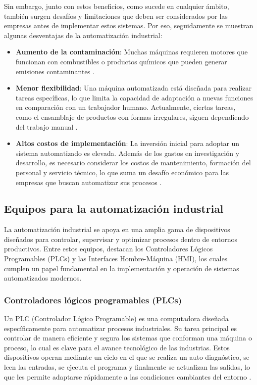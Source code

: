 Sin embargo, junto con estos beneficios, como sucede en cualquier ámbito, también surgen desafíos y limitaciones que deben ser considerados por las empresas antes de implementar estos sistemas. Por eso, seguidamente se muestran algunas desventajas de la automatización industrial:

\begin{itemize}

\item \textbf{Aumento de la contaminación}: Muchas máquinas requieren motores que funcionan con combustibles o productos químicos que pueden generar emisiones contaminantes \cite{des_ventajas_1}.

\item \textbf{Menor flexibilidad}: Una máquina automatizada está diseñada para realizar tareas específicas, lo que limita la capacidad de adaptación a nuevas funciones en comparación con un trabajador humano. Actualmente, ciertas tareas, como el ensamblaje de productos con formas irregulares, siguen dependiendo del trabajo manual \cite{des_ventajas_1}.

\item \textbf{Altos costos de implementación}: La inversión inicial para adoptar un sistema automatizado es elevada. Además de los gastos en investigación y desarrollo, es necesario considerar los costos de mantenimiento, formación del personal y servicio técnico, lo que suma un desafío económico para las empresas que buscan automatizar sus procesos \cite{des_ventajas_2}.
\end{itemize}

\subsection{Equipos para la automatización industrial}

La automatización industrial se apoya en una amplia gama de dispositivos diseñados para controlar, supervisar y optimizar procesos dentro de entornos productivos. Entre estos equipos, destacan los Controladores Lógicos Programables (PLCs) y las Interfaces Hombre-Máquina (HMI), los cuales cumplen un papel fundamental en la implementación y operación de sistemas automatizados modernos.

\subsubsection{Controladores lógicos programables (PLCs)}

Un PLC (Controlador Lógico Programable) es una computadora diseñada específicamente para automatizar procesos industriales. Su tarea principal es controlar de manera eficiente y segura los sistemas que conforman una máquina o proceso, lo cual es clave para el avance tecnológico de las industrias. Estos dispositivos operan mediante un ciclo en el que se realiza un auto diagnóstico, se leen las entradas, se ejecuta el programa y finalmente se actualizan las salidas, lo que les permite adaptarse rápidamente a las condiciones cambiantes del entorno  \cite{plc_info}.

